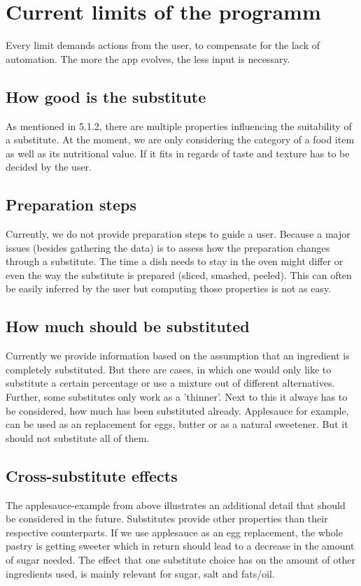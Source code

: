 \section{Current limits of the programm}
Every limit demands actions from the user, to compensate for the lack of automation. The more the app evolves, the less input is necessary.

\subsection*{How good is the substitute}
As mentioned in 5.1.2, there are multiple properties influencing the suitability of a substitute. At the moment, we are only considering the category of a food item as well as its nutritional value. If it fits in regards of taste and texture has to be decided by the user.

\subsection*{Preparation steps}
Currently, we do not provide preparation steps to guide a user. Because a major issues (besides gathering the data) is to assess how the preparation changes through a substitute. The time a dish needs to stay in the oven might differ or even the way the substitute is prepared (sliced, smashed, peeled). This can often be easily inferred by the user but computing those properties is not as easy.

\subsection*{How much should be substituted}
Currently we provide information based on the assumption that an ingredient is completely substituted. But there are cases, in which one would only like to substitute a certain percentage or use a mixture out of different alternatives. Further, some substitutes only work as a 'thinner'. Next to this it always has to be considered, how much has been substituted already. Applesauce for example, can be used as an replacement for eggs, butter or as a natural sweetener. But it should not substitute all of them. 

\subsection*{Cross-substitute effects}
The applesauce-example from above illustrates an additional detail that should be considered in the future. Substitutes provide other properties than their respective counterparts. If we use applesauce as an egg replacement, the whole pastry is getting sweeter which in return should lead to a decrease in the amount of sugar needed.
The effect that one substitute choice has on the amount of other ingredients used, is mainly relevant for sugar, salt and fats/oil.